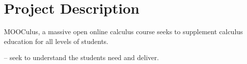 \section{Project Description}



MOOCulus, a massive open online calculus course seeks to supplement
calculus education for all levels of students.

-- seek to understand the students need and deliver. 
